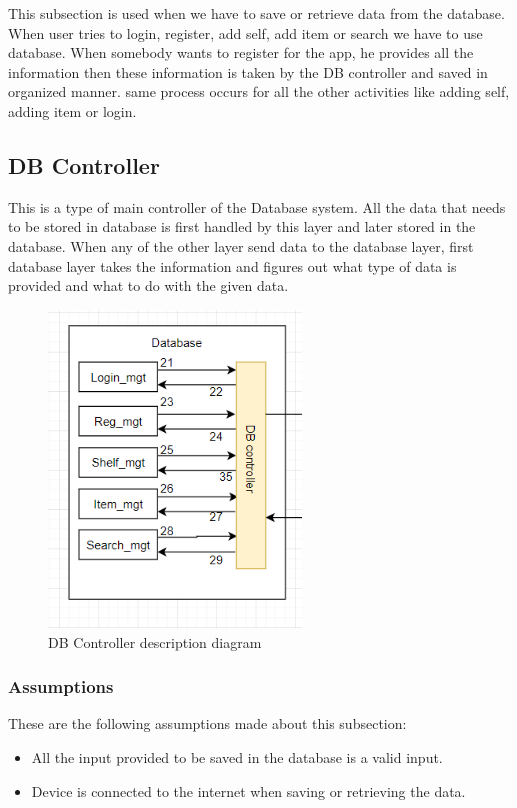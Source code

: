 This subsection is used when we have to save or retrieve data from the database. When user tries to login, register, add self, add item or search we have to use database. When somebody wants to register for the app, he provides all the information then these information is taken by the DB controller and saved in organized manner. same process occurs for all the other activities like adding self, adding item or login.
\subsection{DB Controller}
This is a type of main controller of the Database system. All the data that needs to be stored in database is first handled by this layer and later stored in the database. When any of the other layer send data to the database layer, first database layer takes the information and figures out what type of data is provided and what to do with the given data.

\begin{figure}[h!]
	\centering
 	\includegraphics[width=0.60\textwidth]{images/dbcontroller}
 \caption{DB Controller description diagram}
\end{figure}

\subsubsection{Assumptions}
These are the following assumptions made about this subsection:
\begin{itemize}
    \item All the input provided to be saved in the database is a valid input.
    \item Device is connected to the internet when saving or retrieving the data.
\end{itemize}

